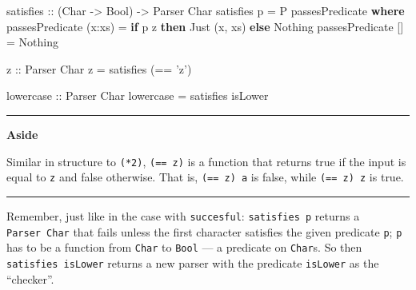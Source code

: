 \documentclass[]{article}
\newenvironment{Shaded}{}{}
\newcommand{\KeywordTok}[1]{\textcolor[rgb]{0.00,0.44,0.13}{\textbf{{#1}}}}
\newcommand{\DataTypeTok}[1]{\textcolor[rgb]{0.56,0.13,0.00}{{#1}}}
\newcommand{\CharTok}[1]{\textcolor[rgb]{0.25,0.44,0.63}{{#1}}}
\newcommand{\OtherTok}[1]{\textcolor[rgb]{0.00,0.44,0.13}{{#1}}}
\newcommand{\FunctionTok}[1]{\textcolor[rgb]{0.02,0.16,0.49}{{#1}}}
\newcommand{\NormalTok}[1]{{#1}}
\begin{document}
\begin{Shaded}
\begin{Highlighting}[]
\OtherTok{satisfies ::} \NormalTok{(}\DataTypeTok{Char} \OtherTok{->} \DataTypeTok{Bool}\NormalTok{) }\OtherTok{->} \DataTypeTok{Parser} \DataTypeTok{Char}
\NormalTok{satisfies p }\FunctionTok{=} \DataTypeTok{P} \NormalTok{passesPredicate}
    \KeywordTok{where}
        \NormalTok{passesPredicate (x}\FunctionTok{:}\NormalTok{xs) }\FunctionTok{=}  \KeywordTok{if} \NormalTok{p z}
                                      \KeywordTok{then} \DataTypeTok{Just} \NormalTok{(x, xs)}
                                      \KeywordTok{else} \DataTypeTok{Nothing}
        \NormalTok{passesPredicate []     }\FunctionTok{=}  \DataTypeTok{Nothing}


\OtherTok{z ::} \DataTypeTok{Parser} \DataTypeTok{Char}
\NormalTok{z }\FunctionTok{=} \NormalTok{satisfies (}\FunctionTok{==} \CharTok{'z'}\NormalTok{)}

\OtherTok{lowercase ::} \DataTypeTok{Parser} \DataTypeTok{Char}
\NormalTok{lowercase }\FunctionTok{=} \NormalTok{satisfies isLower}
\end{Highlighting}
\end{Shaded}

\begin{center}\rule{0.5\linewidth}{\linethickness}\end{center}

\textbf{Aside}

Similar in structure to \texttt{(*2)},
\texttt{(==\ \textquotesingle{}z\textquotesingle{})} is a function that returns
true if the input is equal to \texttt{\textquotesingle{}z\textquotesingle{}} and
false otherwise. That is,
\texttt{(==\ \textquotesingle{}z\textquotesingle{})\ \textquotesingle{}a\textquotesingle{}}
is false, while
\texttt{(==\ \textquotesingle{}z\textquotesingle{})\ \textquotesingle{}z\textquotesingle{}}
is true.

\begin{center}\rule{0.5\linewidth}{\linethickness}\end{center}

Remember, just like in the case with \texttt{succesful}: \texttt{satisfies\ p}
returns a \texttt{Parser\ Char} that fails unless the first character satisfies
the given predicate \texttt{p}; \texttt{p} has to be a function from
\texttt{Char} to \texttt{Bool} --- a predicate on \texttt{Char}s. So then
\texttt{satisfies\ isLower} returns a new parser with the predicate
\texttt{isLower} as the ``checker''.
\end{document}
